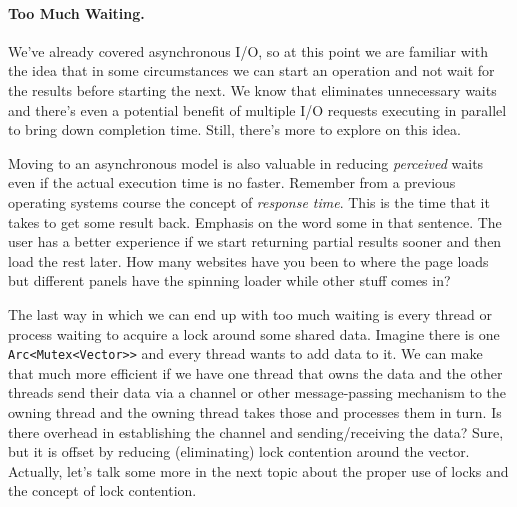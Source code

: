 \paragraph{Too Much Waiting.} 
We've already covered asynchronous I/O, so at this point we are familiar with the idea that in some circumstances we can start an operation and not wait for the results before starting the next. We know that eliminates unnecessary waits and there's even a potential benefit of multiple I/O requests executing in parallel to bring down completion time. Still, there's more to explore on this idea.

Moving to an asynchronous model is also valuable in reducing \textit{perceived} waits even if the actual execution time is no faster. Remember from a previous operating systems course the concept of \textit{response time}. This is the time that it takes to get some result back. Emphasis on the word some in that sentence. The user has a better experience if we start returning partial results sooner and then load the rest later. How many websites have you been to where the page loads but different panels have the spinning loader while other stuff comes in? 


The last way in which we can end up with too much waiting is every thread or process waiting to acquire a lock around some shared data. Imagine there is one \texttt{Arc<Mutex<Vector>{}>} and every thread wants to add data to it. We can make that much more efficient if we have one thread that owns the data and the other threads send their data via a channel or other message-passing mechanism to the owning thread and the owning thread takes those and processes them in turn. Is there overhead in establishing the channel and sending/receiving the data? Sure, but it is offset by reducing (eliminating) lock contention around the vector. Actually, let's talk some more in the next topic about the proper use of locks and the concept of lock contention. 




